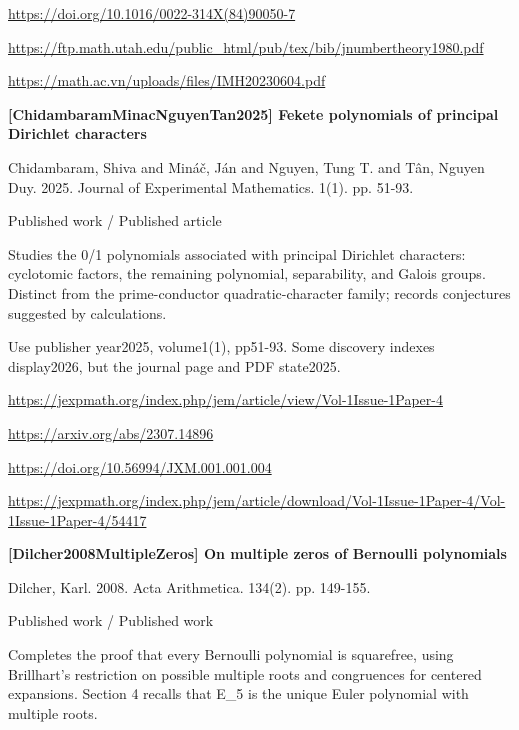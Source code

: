 \documentclass[11pt,a4paper,oneside,openany]{book}
\begin{document}
{\footnotesize\url{https://doi.org/10.1016/0022-314X(84)90050-7}}\par
{\footnotesize\url{https://ftp.math.utah.edu/public_html/pub/tex/bib/jnumbertheory1980.pdf}}\par
{\footnotesize\url{https://math.ac.vn/uploads/files/IMH20230604.pdf}}\par
\vspace{9pt}
\hypertarget{ref:ChidambaramMinacNguyenTan2025}{}
{\sffamily\bfseries\color{atlasgreen}[ChidambaramMinacNguyenTan2025] Fekete polynomials of principal Dirichlet characters}\par
\color{black} Chidambaram, Shiva and Mináč, Ján and Nguyen, Tung T. and Tân, Nguyen Duy. 2025. Journal of Experimental Mathematics. 1(1). pp. 51-93.\par
{\small\sffamily\color{atlasgold}Published work / Published article}\par
\color{black} Studies the 0/1 polynomials associated with principal Dirichlet characters: cyclotomic factors, the remaining polynomial, separability, and Galois groups. Distinct from the prime-conductor quadratic-character family; records conjectures suggested by calculations.\par
{\small Use publisher year2025, volume1(1), pp51-93. Some discovery indexes display2026, but the journal page and PDF state2025.}\par
{\footnotesize\url{https://jexpmath.org/index.php/jem/article/view/Vol-1Issue-1Paper-4}}\par
{\footnotesize\url{https://arxiv.org/abs/2307.14896}}\par
{\footnotesize\url{https://doi.org/10.56994/JXM.001.001.004}}\par
{\footnotesize\url{https://jexpmath.org/index.php/jem/article/download/Vol-1Issue-1Paper-4/Vol-1Issue-1Paper-4/54417}}\par
\vspace{9pt}
\hypertarget{ref:Dilcher2008MultipleZeros}{}
{\sffamily\bfseries\color{atlasgreen}[Dilcher2008MultipleZeros] On multiple zeros of Bernoulli polynomials}\par
\color{black} Dilcher, Karl. 2008. Acta Arithmetica. 134(2). pp. 149-155.\par
{\small\sffamily\color{atlasgold}Published work / Published work}\par
\color{black} Completes the proof that every Bernoulli polynomial is squarefree, using Brillhart's restriction on possible multiple roots and congruences for centered expansions. Section 4 recalls that E\_\allowbreak{}5 is the unique Euler polynomial with multiple roots.\par
\end{document}
